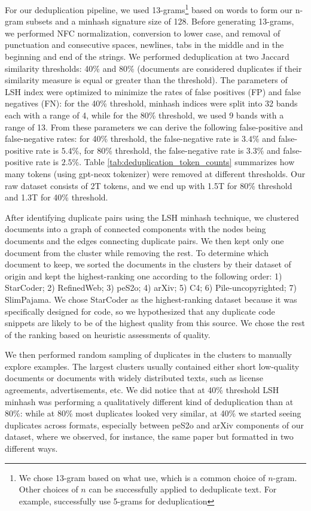 \documentclass{article}
\begin{document}
For our deduplication pipeline, we used 13-grams\footnote{We chose 13-gram based on what \citep{gao2020pile, soldaini2024dolma} use, which is a common choice of $n$-gram. Other choices of $n$ can be successfully applied to deduplicate text. For example, \citep{penedo2023refinedweb, penedo2024fineweb} successfully use 5-grams for deduplication} based on words to form our n-gram subsets and a minhash signature size of 128. Before generating 13-grams, we performed NFC normalization, conversion to lower case, and removal of punctuation and consecutive spaces, newlines, tabs in the middle and in the beginning and end of the strings. We performed deduplication at two Jaccard similarity thresholds: 40\% and 80\% (documents are considered duplicates if their similarity measure is equal or greater than the threshold). The parameters of LSH index were optimized to minimize the rates of false positives (FP) and false negatives (FN): for the 40\% threshold, minhash indices were split into 32 bands each with a range of 4, while for the 80\% threshold, we used 9 bands with a range of 13. From these parameters we can derive the following false-positive and false-negative rates: for 40\% threshold, the false-negative rate is $3.4\%$ and false-positive rate is $5.4\%$, for 80\% threshold, the false-negative rate is $3.3\%$ and false-positive rate is $2.5\%$. Table \ref{tab:deduplication_token_counts} summarizes how many tokens (using gpt-neox tokenizer) were removed at different thresholds. Our raw dataset consists of 2T tokens, and we end up with 1.5T for 80\% threshold and 1.3T for 40\% threshold.

After identifying duplicate pairs using the LSH minhash technique, we clustered documents into a graph of connected components with the nodes being documents and the edges connecting duplicate pairs. We then kept only one document from the cluster while removing the rest. To determine which document to keep, we sorted the documents in the clusters by their dataset of origin and kept the highest-ranking one according to the following order: 1) StarCoder; 2) RefinedWeb; 3) peS2o; 4) arXiv; 5) C4; 6) Pile-uncopyrighted; 7) SlimPajama. We chose StarCoder as the highest-ranking dataset because it was specifically designed for code, so we hypothesized that any duplicate code snippets are likely to be of the highest quality from this source. We chose the rest of the ranking based on heuristic assessments of quality.

We then performed random sampling of duplicates in the clusters to manually explore examples. The largest clusters usually contained either short low-quality documents or documents with widely distributed texts, such as license agreements, advertisements, etc. We did notice that at 40\% threshold LSH minhash was performing a qualitatively different kind of deduplication than at 80\%: while at 80\% most duplicates looked very similar, at 40\% we started seeing duplicates across formats, especially between peS2o and arXiv components of our dataset, where we observed, for instance, the same paper but formatted in two different ways.
\end{document}
